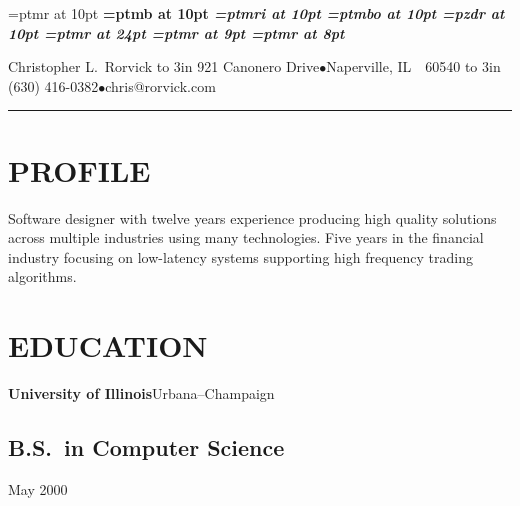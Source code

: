 
\pdfpagewidth 8.5in
\pdfpageheight 11in
\pdfhorigin 1in
\pdfvorigin 1in

\nopagenumbers
\parindent=0pt

\font\rm=ptmr at 10pt
\font\bf=ptmb at 10pt
\font\it=ptmri at 10pt
\font\sl=ptmbo at 10pt
\font\zdb=pzdr at 10pt
\font\lgrm=ptmr at 24pt
\font\smrm=ptmr at 9pt
\font\superrm=ptmr at 8pt

\def\super#1{\lower -.5ex \hbox{\superrm #1}}
\def\xmrk{{\zdb 4}}

\rm

{\lgrm Christopher L.~Rorvick\hfill\vbox{\smrm
\hbox to 3in {\hfil
921 Canonero Drive\quad $\bullet$\quad Naperville, IL~~60540}
\hbox to 3in {\hfil
(630) 416-0382\quad $\bullet$\quad chris@rorvick.com}
}}

\vskip 5pt \hrule \vskip 10pt

\long{}
\long{}
\long{}
\def\bulleted#1#2{\setbox0=\hbox{#1\ }\hangindent=\wd0#1 #2}


\section{PROFILE}{%
Software designer with twelve years experience producing high quality
solutions across multiple industries using many technologies.
Five years in the financial industry focusing on low-latency systems
supporting high frequency trading algorithms.
}

\section{EDUCATION}{%
{\bf University of Illinois}\quad Urbana--Champaign\par
\subsection{B.S.~in Computer Science}
    {May 2000}
}

